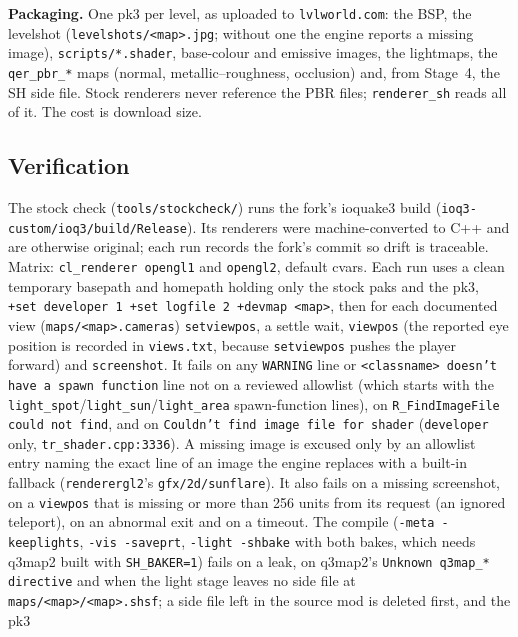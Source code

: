 \documentclass[11pt,a4paper]{article}
\begin{document}
\textbf{Packaging.} One pk3 per level, as uploaded to \texttt{lvlworld.com}: the BSP, the
levelshot (\texttt{levelshots/<map>.jpg}; without one the engine reports a missing image),
\texttt{scripts/*.shader}, base-colour and emissive images, the lightmaps, the
\texttt{qer\_pbr\_*} maps (normal, metallic--roughness, occlusion) and, from Stage~4, the SH side
file. Stock renderers never reference the PBR files; \texttt{renderer\_sh} reads all of it. The cost
is download size.

\subsection{Verification}\label{sec:verify}

The stock check (\texttt{tools/stockcheck/}) runs the fork's ioquake3 build
(\texttt{ioq3-custom/ioq3/build/Release}). Its renderers were machine-converted to C++ and are
otherwise original; each run records the fork's commit so drift is traceable. Matrix:
\texttt{cl\_renderer opengl1} and \texttt{opengl2}, default cvars. Each run uses a clean temporary
basepath and homepath holding only the stock paks and the pk3, \texttt{+set developer 1 +set
logfile 2 +devmap <map>}, then for each documented view (\texttt{maps/<map>.cameras})
\texttt{setviewpos}, a settle wait, \texttt{viewpos} (the reported eye position is recorded in
\texttt{views.txt}, because \texttt{setviewpos} pushes the player forward) and
\texttt{screenshot}. It fails on any \texttt{WARNING} line or \texttt{<classname> doesn't have a
spawn function} line not on a reviewed allowlist (which starts with the
\texttt{light\_spot}/\texttt{light\_sun}/\texttt{light\_area} spawn-function lines), on \texttt{R\_FindImageFile could
not find}, and on \texttt{Couldn't find image file for shader} (\texttt{developer} only,
\texttt{tr\_shader.cpp:3336}). A missing image is excused only by an allowlist entry naming the
exact line of an image the engine replaces with a built-in fallback (\texttt{renderergl2}'s
\texttt{gfx/2d/sunflare}). It also fails on a missing screenshot, on a \texttt{viewpos} that is
missing or more than 256 units from its request (an ignored teleport), on an abnormal exit and on
a timeout. The compile (\texttt{-meta -keeplights}, \texttt{-vis -saveprt}, \texttt{-light
-shbake} with both bakes, which needs q3map2 built with \texttt{SH\_BAKER=1}) fails on a leak, on
q3map2's \texttt{Unknown q3map\_* directive} and when the light stage leaves no side file at
\texttt{maps/<map>/<map>.shsf}; a side file left in the source mod is deleted first, and the pk3
\end{document}
